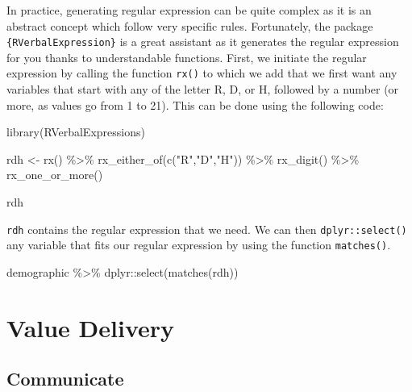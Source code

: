 \documentclass[
]{book}
\newenvironment{Shaded}{\begin{snugshade}}{\end{snugshade}}
\newcommand{\FunctionTok}[1]{\textcolor[rgb]{0.00,0.00,0.00}{#1}}
\newcommand{\NormalTok}[1]{#1}
\newcommand{\OtherTok}[1]{\textcolor[rgb]{0.56,0.35,0.01}{#1}}
\newcommand{\SpecialCharTok}[1]{\textcolor[rgb]{0.00,0.00,0.00}{#1}}
\newcommand{\StringTok}[1]{\textcolor[rgb]{0.31,0.60,0.02}{#1}}
\begin{document}
In practice, generating regular expression can be quite complex as it is an abstract concept which follow very specific rules. Fortunately, the package \texttt{\{RVerbalExpression\}} is a great assistant as it generates the regular expression for you thanks to understandable functions. First, we initiate the regular expression by calling the function \texttt{rx()} to which we add that we first want any variables that start with any of the letter R, D, or H, followed by a number (or more, as values go from 1 to 21). This can be done using the following code:

\begin{Shaded}
\begin{Highlighting}[]
\FunctionTok{library}\NormalTok{(RVerbalExpressions)}

\NormalTok{rdh }\OtherTok{\textless{}{-}} \FunctionTok{rx}\NormalTok{() }\SpecialCharTok{\%\textgreater{}\%} 
  \FunctionTok{rx\_either\_of}\NormalTok{(}\FunctionTok{c}\NormalTok{(}\StringTok{"R"}\NormalTok{,}\StringTok{"D"}\NormalTok{,}\StringTok{"H"}\NormalTok{)) }\SpecialCharTok{\%\textgreater{}\%} 
  \FunctionTok{rx\_digit}\NormalTok{() }\SpecialCharTok{\%\textgreater{}\%} 
  \FunctionTok{rx\_one\_or\_more}\NormalTok{()}

\NormalTok{rdh}
\end{Highlighting}
\end{Shaded}

\texttt{rdh} contains the regular expression that we need. We can then \texttt{dplyr::select()} any variable that fits our regular expression by using the function \texttt{matches()}.

\begin{Shaded}
\begin{Highlighting}[]
\NormalTok{demographic }\SpecialCharTok{\%\textgreater{}\%} 
\NormalTok{  dplyr}\SpecialCharTok{::}\FunctionTok{select}\NormalTok{(}\FunctionTok{matches}\NormalTok{(rdh))}
\end{Highlighting}
\end{Shaded}

\hypertarget{value-delivery}{%
\chapter{Value Delivery}\label{value-delivery}}

\hypertarget{communicate-1}{%
\section{Communicate}\label{communicate-1}}
\end{document}
